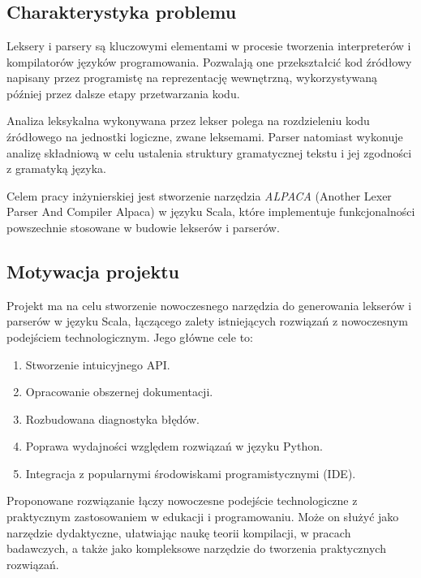 \chapter{\ChapterTitleProjectVision}
\label{sec:cel-wizja}

\section{Charakterystyka problemu}
\label{sec:charakterystyka-problemu}
Leksery i parsery są kluczowymi elementami w procesie tworzenia interpreterów i kompilatorów języków programowania. Pozwalają one przekształcić kod źródłowy napisany przez programistę na reprezentację wewnętrzną, wykorzystywaną później przez dalsze etapy przetwarzania kodu.

Analiza leksykalna wykonywana przez lekser polega na rozdzieleniu kodu źródłowego na jednostki logiczne, zwane leksemami. Parser natomiast wykonuje analizę składniową w celu ustalenia struktury gramatycznej tekstu i jej zgodności z gramatyką języka.

Celem pracy inżynierskiej jest stworzenie narzędzia \textit{ALPACA} (Another Lexer Parser And Compiler Alpaca) w języku Scala, które implementuje funkcjonalności powszechnie stosowane w budowie lekserów i parserów. 

\section{Motywacja projektu}
\label{sec:motywacja-projektu}

Projekt ma na celu stworzenie nowoczesnego narzędzia do generowania lekserów i parserów w języku Scala, łączącego zalety istniejących rozwiązań z nowoczesnym podejściem technologicznym. Jego główne cele to:
\begin{enumerate}
    \item Stworzenie intuicyjnego API.
    \item Opracowanie obszernej dokumentacji.
    \item Rozbudowana diagnostyka błędów. 
    \item Poprawa wydajności względem rozwiązań w języku Python.
    \item Integracja z popularnymi środowiskami programistycznymi (IDE).
\end{enumerate}

Proponowane rozwiązanie łączy nowoczesne podejście technologiczne z praktycznym zastosowaniem w edukacji i programowaniu. Może on służyć jako narzędzie dydaktyczne, ułatwiając naukę teorii kompilacji, w pracach badawczych, a także jako kompleksowe narzędzie do tworzenia praktycznych rozwiązań.

